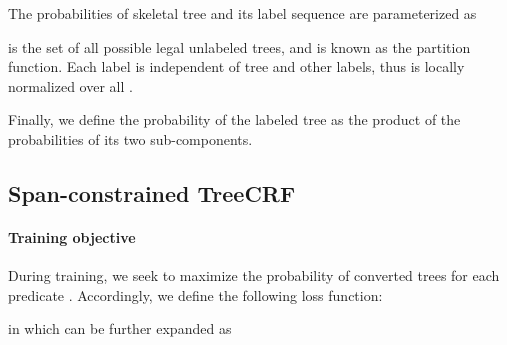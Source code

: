 \documentclass[11pt]{article}
\begin{document}
The probabilities of skeletal tree  and its label sequence  are parameterized as

 is the set of all possible legal unlabeled trees, and  is known as the partition function.
Each label  is independent of tree  and other labels, thus  is locally normalized over all .

Finally, we define the probability of the labeled tree  as the product of the probabilities of its two sub-components.


\subsection{Span-constrained TreeCRF}\label{sec:span-constrained-treecrf}

\paragraph{Training objective}
During training, we seek to maximize the probability of converted trees  for each predicate .
Accordingly, we define the following loss function:

in which  can be further expanded as
\end{document}
